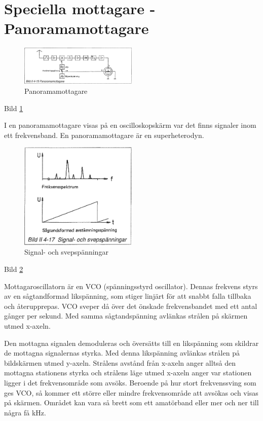 \section{Speciella mottagare - Panoramamottagare}

\begin{figure}
  \includegraphics[width=0.5\textwidth]{images/bild_2_4-15}
  \caption{Panoramamottagare}
  \label{fig:bildII4-15}
\end{figure}

Bild \ref{fig:bildII4-15}

I en panoramamottagare visas på en oscilloskopskärm var det finns
signaler inom ett frekvensband. En panoramamottagare är en
superheterodyn.

\begin{figure}
  \includegraphics[width=0.5\textwidth]{images/bild_2_4-17}
  \caption{Signal- och svepspänningar}
  \label{fig:bildII4-17}
\end{figure}

Bild \ref{fig:bildII4-17}

Mottagaroscillatorn är en VCO (spänningsstyrd oscillator). Dennas
frekvens styrs av en sågtandformad likspänning, som stiger linjärt för
att snabbt falla tillbaka och återupprepas. VCO sveper då över det
önskade frekvensbandet med ett antal gånger per sekund. Med
samma sågtandspänning avlänkas strålen på skärmen utmed x-axeln.

Den mottagna signalen demoduleras och översätts till en likspänning
som skildrar de mottagna signalernas styrka. Med denna likspänning
avlänkas strålen på bildskärmen utmed y-axeln. Strålens avstånd från
x-axeln anger alltså den mottagna stationens styrka och strålens läge
utmed x-axeln anger var stationen ligger i det frekvensområde som
avsöks. Beroende på hur stort frekvenssving som ges VCO, så kommer ett
större eller mindre frekvensområde att avsökas och visas på
skärmen. Området kan vara så brett som ett amatörband eller mer och
ner till några få kHz.

